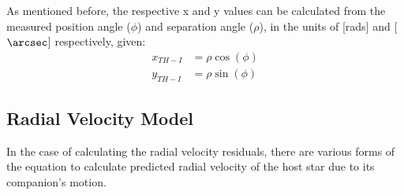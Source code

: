 \documentclass[12pt,preprint]{aastex}
\begin{document}

As mentioned before, the respective x and y values can be calculated from the measured position angle ($\phi$) and separation angle ($\rho$), in the units of [rads] and [$\arcsec$] respectively, given:
\begin{subequations}
\begin{align}\label{eq:28-2a}
x_{TH-I}& = \rho \cos(\phi)\\
\label{eq:28-2b}
y_{TH-I}& = \rho \sin(\phi)
\end{align}
\end{subequations}
\pagebreak

\subsection{Radial Velocity Model}\label{sec:RV-OrbModels}

In the case of calculating the radial velocity residuals, there are various forms of the equation to calculate predicted radial velocity of the host star due to its companion's motion.
\end{document}
